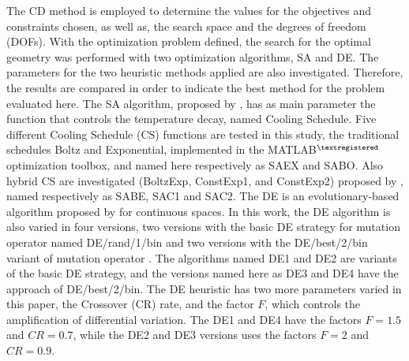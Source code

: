 \documentclass[12pt,fleqn]{article}
\begin{document}
The CD method is employed to determine the values for the  objectives and constraints chosen, as well as, the search space and the degrees of freedom (DOFs). With the optimization problem defined, the search for the optimal geometry was performed with two optimization algorithms, SA and DE. The parameters for the two heuristic methods applied are also investigated. Therefore, the results are compared in order to indicate the best method for the problem evaluated here. The SA algorithm, proposed by \cite{Kirkpatrick1983}, has as main parameter the function that controls the temperature decay, named Cooling Schedule. Five different Cooling Schedule (CS) functions are tested in this study, the traditional schedules Boltz and Exponential, implemented in the MATLAB$^{\tiny ®}$ optimization toolbox, and named here respectively as SAEX and SABO. Also hybrid CS are investigated (BoltzExp, ConstExp1, and ConstExp2) proposed by \cite{Gonzales2015b, Gonzales2015a}, named respectively as SABE, SAC1 and SAC2. The DE is an evolutionary-based algorithm proposed by \cite{Storn1997} for continuous spaces. In this work, the DE algorithm is also varied in four versions, two versions with the basic DE strategy for mutation operator named DE/rand/1/bin and two versions with the DE/best/2/bin variant of mutation operator \citep{Storn1997}. The algorithms named DE1 and DE2 are variants of the basic DE strategy, and the versions named here as DE3 and DE4 have the approach of  DE/best/2/bin. The DE heuristic has two more parameters varied in this paper, the Crossover (CR) rate, and the factor $F$, which controls the amplification of differential variation. The DE1 and DE4 have the factors $F=1.5$ and $CR=0.7$, while the DE2 and DE3 versions uses the factors $F=2$ and $CR=0.9$.
\end{document}
